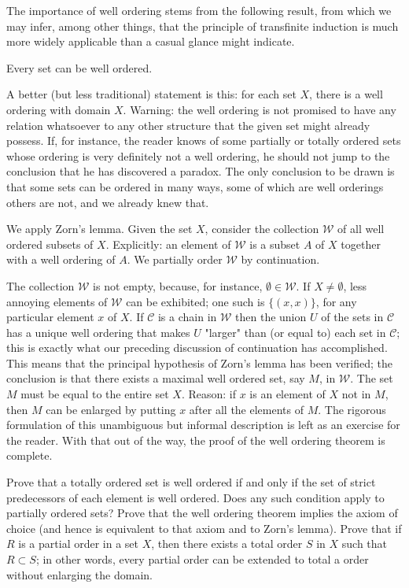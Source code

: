 The importance of well ordering stems from the following result, from which we may infer, among other things, that the principle of transfinite induction is much more widely applicable than a casual glance might indicate. 

\begin{named} Every set can be well ordered. 
\end{named}

\subtitle{Discussion} A better (but less traditional) statement is this: for each set $X$, there is a well ordering with domain $X$. Warning: the well ordering is not promised to have any relation whatsoever to any other structure that the given set might already possess. If, for instance, the reader knows of some partially or totally ordered sets whose ordering is very definitely not a well ordering, he should not jump to the conclusion that he has discovered a paradox. The only conclusion to be drawn is that some sets can be ordered in many ways, some of which are well orderings others are not, and we already knew that. 

\subtitle{Proof} We apply Zorn's lemma. Given the set $X$, consider the collection $\mathcal{W}$ of all well ordered subsets of $X$. Explicitly: an element of $\mathcal{W}$ is a subset $A$ of $X$ together with a well ordering of $A$. We partially order $\mathcal{W}$ by continuation. 

The collection $\mathcal{W}$ is not empty, because, for instance, $\emptyset \in \mathcal{W}$. If $X \neq \emptyset$, less annoying elements of $\mathcal{W}$ can be exhibited; one such is $\{ (x,x) \}$, for any particular element $x$ of $X$. If $\mathcal{C}$ is a chain in $\mathcal{W}$ then the union $U$ of the sets in $\mathcal{C}$ has a unique well ordering that makes $U$ "larger" than (or equal to) each set in $\mathcal{C}$; this is exactly what our preceding discussion of continuation has accomplished. This means that the principal hypothesis of Zorn's lemma has been verified; the conclusion is that there exists a maximal well ordered set, say $M$, in $\mathcal{W}$. The set $M$ must be equal to the entire set $X$. Reason: if $x$ is an element of $X$ not in $M$, then $M$ can be enlarged by putting $x$ after all the elements of $M$. The rigorous formulation of this unambiguous but informal description is left as an exercise for the reader. With that out of the way, the proof of the well ordering theorem is complete. 

\begin{exercise} Prove that a totally ordered set is well ordered if and only if the set of strict predecessors of each element is well ordered. Does any such condition apply to partially ordered sets? Prove that the well ordering theorem implies the axiom of choice (and hence is equivalent to that axiom and to Zorn's lemma). Prove that if $R$ is a partial order in a set $X$, then there exists a total order $S$ in $X$ such that $R \subset S$; in other words, every partial order can be extended to total a order without enlarging the domain.
\end{exercise}